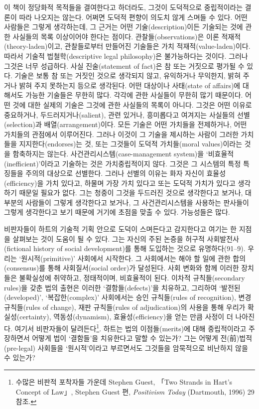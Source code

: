 이 책이 정당화적 목적들을 결여한다고 하더라도, 그것이 도덕적으로
중립적이라는 결론이 따라 나오지는 않는다. 어쩌면 도덕적 편향이 의도치
않게 스며들 수 있다. 어떤 사람들은 그렇게 생각하는데, 그 근거는 어떤
기술(description)이든 기술되는 것에 관한 사실들의 목록 이상이어야 한다는
점이다. 관찰들(observations)은 이론 적재적(theory-laden)이고,
관찰들로부터 만들어진 기술들은 가치 적재적(value-laden)이다. 따라서
기술적 법철학(descriptive legal philosophy)은 불가능하다는 것이다.
그러나 그것은 너무 성급하다. 사실 진술(statement of fact)은 참 또는
거짓으로 평가될 수 있다. 기술은 보통 참 또는 거짓인 것으로 생각되지
않고, 유익하거나 무익한지, 밝혀 주거나 밝혀 주지 못하는지 등으로
생각된다. 어떤 대상이나 사태(state of affairs)에 대해서도 가능한
기술들은 무한히 많다. 각각에 관한 사실들이 무한히 많기 때문이다. 어떤
것에 대한 실제의 기술은 그것에 관한  사실들의 목록이 아니다.
그것은 어떤 이유로 중요하거나, 두드러지거나(salient), 관련 있거나,
흥미롭다고 여겨지는 사실들의 선별(selection)과 배열(arrangement)이다.
모든 기술은 어떤 가치들을 전제하거나, 어떤 가치들의 관점에서 이루어진다.
그러나 이것이 그 기술을 제시하는 사람이 그러한 가치들을
지지한다(endorses)는 것, 또는 그것들이 도덕적 가치들(moral values)이라는
것을 함축하지는 않는다. 사건관리시스템(case-management system)을
‘비효율적(inefficient)’이라고 기술하는 것은 가치중립적이지 않다. 그것은
그 시스템의 특정 특징들을 주의의 대상으로 선별한다. 그러나 선별의 이유는
화자 자신이 효율성(efficiency)을 가치 있다고, 하물며 가장 가치 있다고
또는 도덕적 가치가 있다고 생각하기 때문일 필요가 없다. 그는 청중이
그것을 두드러진 것으로 생각한다고 보거나, 대부분의 사람들이 그렇게
생각한다고 보거나, 그 사건관리시스템을 사용하는 판사들이 그렇게
생각한다고 보기 때문에 거기에 초점을 맞출 수 있다. 가능성들은 많다.

비판자들이 하트의 기술적 기획 안으로 도덕이 스며든다고 감지한다고 여기는
한 지점을 살펴보는 것이 도움이 될 수 있다. 그는 자신의 주된 논증을
허구적 사회발전사(fictional history of social development)를 통해
도입하는 것으로 유명하다(91--9). 우리는 ‘원시적(primitive)’ 사회에서
시작한다. 그 사회에서는 해야 할 일에 관한 합의(consensus)를 통해
사회질서(social order)가 달성된다. 사회 변화와 함께 이러한 장치들은
불확실성에 취약하고, 정태적이며, 비효율적이 된다. 이차적
규칙들(secondary rules)을 갖춘 법의 출현은 이러한 ‘결함들(defects)’을
치유하고, 그리하여 ‘발전된(developed)’, ‘복잡한(complex)’ 사회에서는
승인 규칙들(rules of recognition), 변경 규칙들(rules of change), 재판
규칙들(rules of adjudication)의 사용을 통해 우리가 확실성(certainty),
역동성(dynamism), 효율성(efficiency)을 얻는 만큼 사정이 더 나아진다.
여기서 비판자들이 달려든다\footnote{수많은 비판적 포착자들 가운데
  Stephen Guest, 「Two Strands in Hart's Concept of Law」, Stephen Guest
  편, \emph{Positivism Today} (Dartmouth, 1996) 29 참조.}. 하트는 법의
이점들(merits)에 대해 중립적이라고 주장하면서 어떻게 법이 ‘결함들’을
치유한다고 말할 수 있는가? 그는 어떻게 전(前)법적(pre-legal) 사회들을
‘원시적’이라고 부르면서도 그것들을 암묵적으로 비난하지 않을 수 있는가?


